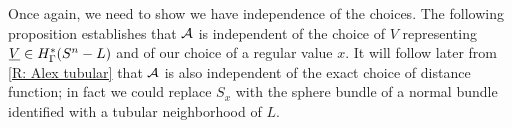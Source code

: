 \begin{comment}
	It will be useful to note for later that if $W \in PC^{i+1}(S^n)$ then by \cref{P: Leibniz cap},
	\begin{align}
		\bd (W \times_{S^n} D_x^-) &= \left[(-1)^{i+1} (\bd W) \times_{S^n} D_x^-\right] \bigsqcup (W \times_{S^n} \bd D_x^-)\notag\\
		&= \left[(-1)^{i+1} (\bd W) \times_{S^n} D_x^-\right] \bigsqcup - (W \times_{S^n} S_x). \label{E: leib bd}
	\end{align}
\end{comment}

Once again, we need to show we have independence of the choices.
The following proposition establishes that $\mathcal{A}$ is independent of the choice of $V$ representing $\underline{V} \in H^*_\Gamma(S^n-L)$ and of our choice of a regular value $x$.
It will follow later from \cref{R: Alex tubular} that $\mathcal{A}$ is also independent of the exact choice of distance function; in fact we could replace $S_x$ with the sphere bundle of a normal bundle identified with a tubular neighborhood of $L$.


